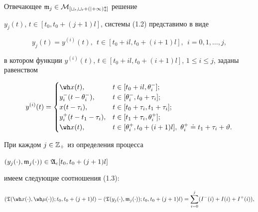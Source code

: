 Отвечающее $\frak m_j\in\cal M_{[t_0,t_0+(j+1)l]}$ решение


$y_{j}(t)$, $t\in[t_0,t_0+(j+1)l]$, системы (1.2) представимо в виде


\begin{equation}


y_{j}(t)=


y^{(i)}(t),\ \ t\in[t_0+il,t_0+(i+1)l],\ \ i=0,1,\dotsc,j,


\end{equation}


в котором функции $y^{(i)}(t)$, $t\in[t_0+il,t_0+(i+1)l]$, $1\le


i\le j$, заданы равенством


\begin{equation}


y^{(i)}(t)=\begin{cases}


\wh x(t),& t\in[t_0+il,\theta_i^-];\\


y_i^-(t-\theta_i^-), & t\in[\theta_i^{-},t_0+\tau_i];\\


x(t-\tau_i),& t\in[t_0+\tau_i,t_1+\tau_i];\\


y_i^+(t-t_1-\tau_i),& t\in[t_1+\tau_i,\theta_i^+]; \\


\wh x(t),& t\in[\theta_i^+,t_0+(i+1)l],\ \theta_i^+\doteq t_1


+\tau_i+\vartheta.


\end{cases}


\end{equation}





При каждом $j\in\Bbb Z_+$ из определения процесса


$(y_j(\cdot),\frak m_j(\cdot))\in\frak A_c[t_0,t_0+(j+1)l]$


имеем следующие соотношения (1.3):


\begin{equation}


(\frak T(\wh x(\cdot),\wh\mu(\cdot));t_0,t_0+(j+1)l)-


(\frak T(y_j(\cdot),\frak m_j(\cdot));t_0,t_0+(j+1)l)=


\sum_{i=0}^j(I^-(i)+I(i)+I^+(i)),


\end{equation}


